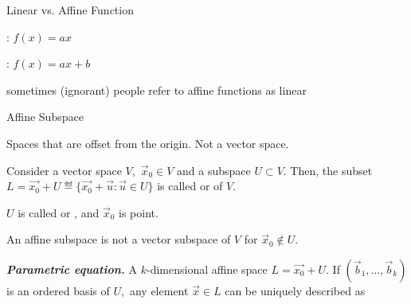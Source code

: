 \documentclass[handout,fleqn,aspectratio=169]{beamer}
\begin{document}
\begin{frame}{Linear vs. Affine Function}

\plitemsep 0.1in
{
\bci 
\item {}: $f(x) = ax$ 
\item {}: $f(x) = ax + b$ 
\item sometimes (ignorant) people refer to affine functions as linear
\eci
}
{
\centering
{}
}

\end{frame}

\begin{frame}{Affine Subspace}

\plitemsep 0.1in
\bci 
\item Spaces that are offset from the origin. Not a vector space.

\item {} Consider a vector space $V,$ $\vec{x}_0 \in V$ and a subspace $U \subset V.$ Then, the subset $L  = \vec{x_0} + U \eqdef \{\vec{x_0} + \vec{u} : \vec{u} \in U \}$ is called  or  of $V.$

\item $U$ is called  or , and $\vec{x}_0$ is  point.

\item An affine subspace is not a vector subspace of $V$ for $\vec{x}_0 \notin U.$

\item {\bf \em Parametric equation.} A $k$-dimensional affine space $L = \vec{x_0} + U.$ If $(\vec{b}_1, \ldots, \vec{b}_k)$ is an ordered basis of $U,$ any element $\vec{x} \in L$ can be uniquely described as

\eci

\end{frame}
\end{document}
